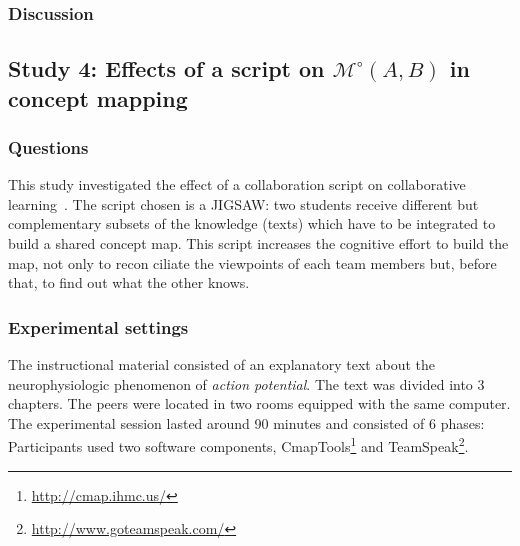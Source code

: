 \documentclass[twocolumn]{article}
\newcommand{\gModel}[2]{{$\mathcal{M}^{\circ}(#1, #2)$}}
\begin{document}
\subsubsection*{Discussion}





\subsection{Study 4:  Effects of a script on \gModel{A}{B}  in concept mapping}

\subsubsection*{Questions}

This study investigated the effect of a collaboration script on collaborative
learning~\cite{molinari2008effects}. The script chosen is a JIGSAW: two students
receive different but complementary subsets of the knowledge (texts) which have
to be integrated to build a shared concept map.  This script increases the
cognitive effort to build the map, not only to recon ciliate the viewpoints of
each team members but, before that, to find out what the other knows. 

\subsubsection*{Experimental settings}

The instructional material consisted of an explanatory text about the
neurophysiologic phenomenon of \emph{action potential}. The text was divided
into 3 chapters. The peers were located in two rooms equipped with the same
computer.  The experimental session lasted around 90 minutes and consisted of 6
phases: Participants used two software components, {\sc
CmapTools}\footnote{\url{http://cmap.ihmc.us/}} and {\sc
TeamSpeak}\footnote{\url{http://www.goteamspeak.com/}}.
\end{document}
